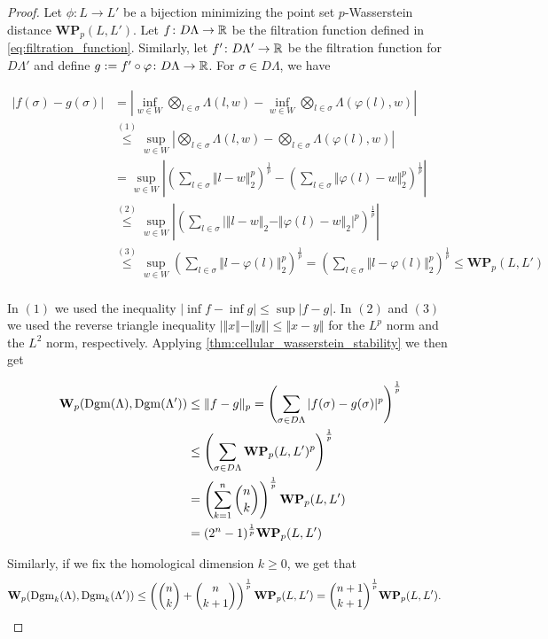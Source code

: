 	\begin{proof}
		Let $\phi\colon L\to L'$ be a bijection minimizing the point set $p$-Wasserstein distance $\textbf{WP}_p(L,L')$. Let $f\colon D\Lambda\to\mathbb{R}$ be the filtration function defined in \cref{eq:filtration_function}. Similarly, let $f'\colon D\Lambda'\to\mathbb{R}$ be the filtration function for $D\Lambda'$ and define $g:=f'\circ\varphi\colon D\Lambda\to\mathbb{R}$. For $\sigma\in D\Lambda$, we have
		
		\begin{align*}
			\vert f(\sigma) - g(\sigma)\vert &= \left\vert \inf_{w\in W}\bigotimes_{l\in\sigma}\Lambda(l,w) - \inf_{w\in W}\bigotimes_{l\in\sigma}\Lambda(\varphi(l),w)\right\vert\\
			&\overset{(1)}\leq\sup_{w\in W}\left\vert\bigotimes_{l\in\sigma}\Lambda(l,w)-\bigotimes_{l\in\sigma}\Lambda(\varphi(l),w)\right\vert\\
			&=\sup_{w\in W}\left\vert \left(\sum_{l\in\sigma}\Vert l-w\Vert_2^p\right)^{\frac{1}{p}} - \left(\sum_{l\in\sigma}\Vert \varphi(l)-w\Vert_2^p\right)^{\frac{1}{p}}\right\vert \\
			&\overset{(2)}\leq\sup_{w\in W}\left\vert \left(\sum_{l\in\sigma}\vert\Vert l-w\Vert_2-\Vert \varphi(l)-w\Vert_2\vert^p \right)^{\frac{1}{p}} \right\vert\\
			&\overset{(3)}\leq\sup_{w\in W}\left(\sum_{l\in\sigma}\Vert l-\varphi(l)\Vert_2^p \right)^{\frac{1}{p}} =\left(\sum_{l\in\sigma}\Vert l-\varphi(l)\Vert_2^p \right)^{\frac{1}{p}}\leq\textbf{WP}_p(L,L') \\
		\end{align*}
	
		In $(1)$ we used the inequality $\vert\inf f - \inf g\vert\leq \sup\vert f-g\vert$. In $(2)$ and $(3)$ we used the reverse triangle inequality $\vert\Vert x\Vert-\Vert y\Vert\vert\leq\Vert x-y\Vert$ for the $L^p$ norm and the $L^2$ norm, respectively. Applying \cref{thm:cellular_wasserstein_stability} we then get
		
		\begin{align*}
			\textbf{W}_p(\operatorname{Dgm}(\Lambda), \operatorname{Dgm}(\Lambda'))&\leq \Vert f-g\Vert_p = \left(\sum_{\sigma\in D\Lambda}\vert f(\sigma)-g(\sigma)\vert^p\right)^{\frac{1}{p}}\\
			&\leq\left(\sum_{\sigma\in D\Lambda}\textbf{WP}_p(L,L')^p\right)^{\frac{1}{p}}\\
			&= \left(\sum_{k=1}^n\binom{n}{k}\right)^{\frac{1}{p}}\textbf{WP}_p(L,L')\\
			&=(2^n-1)^{\frac{1}{p}}\textbf{WP}_p(L,L')
		\end{align*}
		
		Similarly, if we fix the homological dimension $k\geq0$, we get that
		\begin{align*}
			\textbf{W}_p(\operatorname{Dgm}_k(\Lambda), \operatorname{Dgm}_k(\Lambda'))&\leq\left(\binom{n}{k}+\binom{n}{k+1}\right)^{\frac{1}{p}}\textbf{WP}_p(L,L') = \binom{n+1}{k+1}^{\frac{1}{p}}\textbf{WP}_p(L,L').
		\end{align*}
	
	\end{proof}

